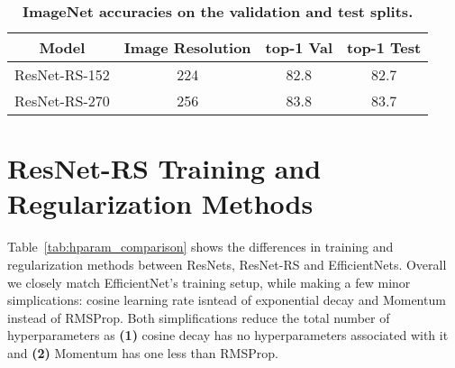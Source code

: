 \documentclass{article}
\begin{document}
\begin{table}[h!]
\begin{center}
\small
\begin{tabular}{cccc}
  \toprule
  Model & Image Resolution & top-1 Val & top-1 Test \\
  \midrule
  ResNet-RS-152 & 224 & 82.8 & 82.7 \\
  ResNet-RS-270 & 256 & 83.8 & 83.7 \\
  \bottomrule
\end{tabular}
\end{center}
\vspace{-0.3cm}
\caption{\textbf{ImageNet accuracies on the validation and test splits.}} 
\label{tab:imagenet_test_split} 
\end{table}

\section{ResNet-RS Training and Regularization Methods\label{sec:appendix_training_details}}
Table~\ref{tab:hparam_comparison} shows the differences in training and regularization methods between ResNets, ResNet-RS and EfficientNets. Overall we closely match EfficientNet's training setup, while making a few minor simplications: cosine learning rate isntead of exponential decay and Momentum instead of RMSProp. 
Both simplifications reduce the total number of hyperparameters as \textbf{(1)} cosine decay has no hyperparameters associated with it and \textbf{(2)} Momentum has one less than RMSProp.
\end{document}
